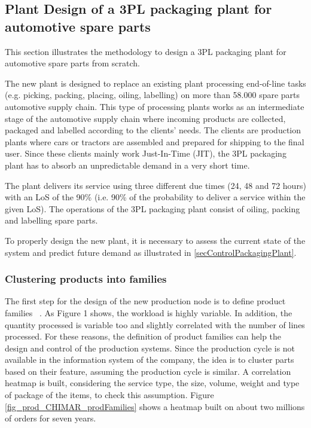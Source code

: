 \subsection{Plant Design of a 3PL packaging plant for automotive spare parts}
This section illustrates the methodology to design a 3PL packaging plant for automotive spare parts from scratch.\par

The new plant is designed to replace an existing plant processing end-of-line tasks (e.g. picking, packing, placing, oiling, labelling) on more than 58.000 spare parts automotive supply chain. This type of processing plants works as an intermediate stage of the automotive supply chain where incoming products are collected, packaged and labelled according to the clients' needs. The clients are production plants where cars or tractors are assembled and prepared for shipping to the final user. Since these clients mainly work Just-In-Time (JIT), the 3PL packaging plant has to absorb an unpredictable demand in a very short time. \par

The plant delivers its service using three different due times (24, 48 and 72 hours) with an LoS of the 90\% (i.e. 90\% of the probability to deliver a service within the given LoS). The operations of the 3PL packaging plant consist of oiling, packing and labelling spare parts. \par

To properly design the new plant, it is necessary to assess the current state of the system and predict future demand as illustrated in \ref{secControlPackagingPlant}.

\subsubsection{Clustering products into families}

The first step for the design of the new production node is to define product families ~\cite{Tufano2020ISM}. As Figure 1 shows, the workload is highly variable. In addition, the quantity processed is variable too and slightly correlated with the number of lines processed. For these reasons, the definition of product families can help the design and control of the production systems. Since the production cycle is not available in the information system of the company, the idea is to cluster parts based on their feature, assuming the production cycle is similar. A correlation heatmap is built, considering the service type, the size, volume, weight and type of package of the items, to check this assumption. Figure \ref{fig_prod_CHIMAR_prodFamilies} shows a heatmap built on about two millions of orders for seven years.

